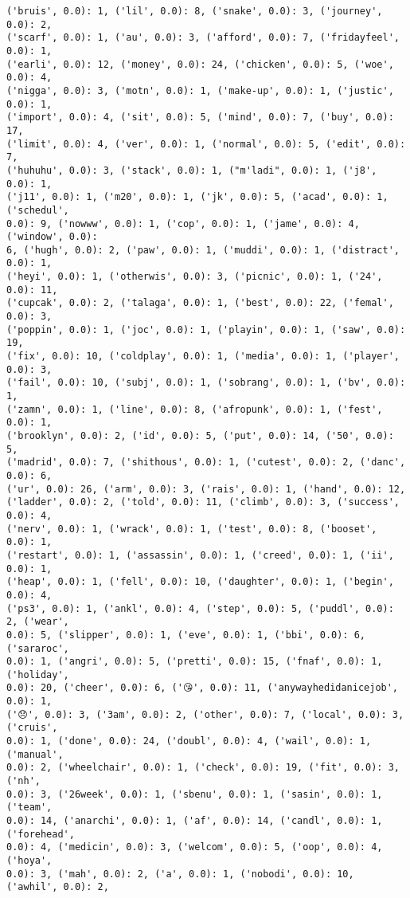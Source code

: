 \documentclass[11pt]{article}
\begin{document}
\begin{Verbatim}[commandchars=\\\{\}]
('bruis', 0.0): 1, ('lil', 0.0): 8, ('snake', 0.0): 3, ('journey', 0.0): 2,
('scarf', 0.0): 1, ('au', 0.0): 3, ('afford', 0.0): 7, ('fridayfeel', 0.0): 1,
('earli', 0.0): 12, ('money', 0.0): 24, ('chicken', 0.0): 5, ('woe', 0.0): 4,
('nigga', 0.0): 3, ('motn', 0.0): 1, ('make-up', 0.0): 1, ('justic', 0.0): 1,
('import', 0.0): 4, ('sit', 0.0): 5, ('mind', 0.0): 7, ('buy', 0.0): 17,
('limit', 0.0): 4, ('ver', 0.0): 1, ('normal', 0.0): 5, ('edit', 0.0): 7,
('huhuhu', 0.0): 3, ('stack', 0.0): 1, ("m'ladi", 0.0): 1, ('j8', 0.0): 1,
('j11', 0.0): 1, ('m20', 0.0): 1, ('jk', 0.0): 5, ('acad', 0.0): 1, ('schedul',
0.0): 9, ('nowww', 0.0): 1, ('cop', 0.0): 1, ('jame', 0.0): 4, ('window', 0.0):
6, ('hugh', 0.0): 2, ('paw', 0.0): 1, ('muddi', 0.0): 1, ('distract', 0.0): 1,
('heyi', 0.0): 1, ('otherwis', 0.0): 3, ('picnic', 0.0): 1, ('24', 0.0): 11,
('cupcak', 0.0): 2, ('talaga', 0.0): 1, ('best', 0.0): 22, ('femal', 0.0): 3,
('poppin', 0.0): 1, ('joc', 0.0): 1, ('playin', 0.0): 1, ('saw', 0.0): 19,
('fix', 0.0): 10, ('coldplay', 0.0): 1, ('media', 0.0): 1, ('player', 0.0): 3,
('fail', 0.0): 10, ('subj', 0.0): 1, ('sobrang', 0.0): 1, ('bv', 0.0): 1,
('zamn', 0.0): 1, ('line', 0.0): 8, ('afropunk', 0.0): 1, ('fest', 0.0): 1,
('brooklyn', 0.0): 2, ('id', 0.0): 5, ('put', 0.0): 14, ('50', 0.0): 5,
('madrid', 0.0): 7, ('shithous', 0.0): 1, ('cutest', 0.0): 2, ('danc', 0.0): 6,
('ur', 0.0): 26, ('arm', 0.0): 3, ('rais', 0.0): 1, ('hand', 0.0): 12,
('ladder', 0.0): 2, ('told', 0.0): 11, ('climb', 0.0): 3, ('success', 0.0): 4,
('nerv', 0.0): 1, ('wrack', 0.0): 1, ('test', 0.0): 8, ('booset', 0.0): 1,
('restart', 0.0): 1, ('assassin', 0.0): 1, ('creed', 0.0): 1, ('ii', 0.0): 1,
('heap', 0.0): 1, ('fell', 0.0): 10, ('daughter', 0.0): 1, ('begin', 0.0): 4,
('ps3', 0.0): 1, ('ankl', 0.0): 4, ('step', 0.0): 5, ('puddl', 0.0): 2, ('wear',
0.0): 5, ('slipper', 0.0): 1, ('eve', 0.0): 1, ('bbi', 0.0): 6, ('sararoc',
0.0): 1, ('angri', 0.0): 5, ('pretti', 0.0): 15, ('fnaf', 0.0): 1, ('holiday',
0.0): 20, ('cheer', 0.0): 6, ('😘', 0.0): 11, ('anywayhedidanicejob', 0.0): 1,
('😞', 0.0): 3, ('3am', 0.0): 2, ('other', 0.0): 7, ('local', 0.0): 3, ('cruis',
0.0): 1, ('done', 0.0): 24, ('doubl', 0.0): 4, ('wail', 0.0): 1, ('manual',
0.0): 2, ('wheelchair', 0.0): 1, ('check', 0.0): 19, ('fit', 0.0): 3, ('nh',
0.0): 3, ('26week', 0.0): 1, ('sbenu', 0.0): 1, ('sasin', 0.0): 1, ('team',
0.0): 14, ('anarchi', 0.0): 1, ('af', 0.0): 14, ('candl', 0.0): 1, ('forehead',
0.0): 4, ('medicin', 0.0): 3, ('welcom', 0.0): 5, ('oop', 0.0): 4, ('hoya',
0.0): 3, ('mah', 0.0): 2, ('a', 0.0): 1, ('nobodi', 0.0): 10, ('awhil', 0.0): 2,

\end{Verbatim}
\end{document}
